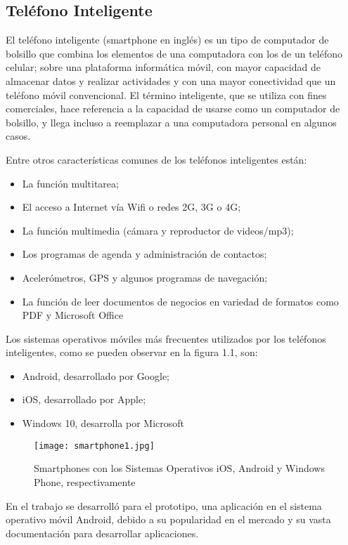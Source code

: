 \subsection{Teléfono Inteligente}

\par
El teléfono inteligente (smartphone en inglés) es un tipo de computador de bolsillo que combina los elementos de una computadora con los de un teléfono celular; sobre una plataforma informática móvil, con mayor capacidad de almacenar datos y realizar actividades y con una mayor conectividad que un teléfono móvil convencional. El término inteligente, que se utiliza con fines comerciales, hace referencia a la capacidad de usarse como un computador de bolsillo, y llega incluso a reemplazar a una computadora personal en algunos casos\cite{smartphone}.

\par \noindent
Entre otros características comunes de los teléfonos inteligentes están:\cite{smartphone}

\begin{itemize}
\item La función multitarea;

\item El acceso a Internet vía Wifi o redes 2G, 3G o 4G;

\item La función multimedia (cámara y reproductor de videos/mp3);

\item Los programas de agenda y administración de contactos;

\item Acelerómetros, GPS y algunos programas de navegación;

\item La función de leer documentos de negocios en variedad de formatos como PDF y Microsoft Office
\end{itemize}

\par \noindent
Los sistemas operativos móviles más frecuentes utilizados por los teléfonos inteligentes, como se pueden observar en la figura 1.1, son:\cite{smartphone}

\begin{itemize}
\item Android, desarrollado por Google;

\item iOS, desarrollado por Apple;

\item Windows 10, desarrolla por Microsoft
\end{itemize}

\begin{figure}[H]
\texttt{[image: smartphone1.jpg]}
\caption{Smartphones con los Sistemas Operativos iOS, Android y Windows Phone, respectivamente}
\end{figure}

\par \noindent
En el trabajo se desarrolló para el prototipo, una aplicación en el sistema operativo móvil Android, debido a su popularidad en el mercado y su vasta documentación para desarrollar aplicaciones.


